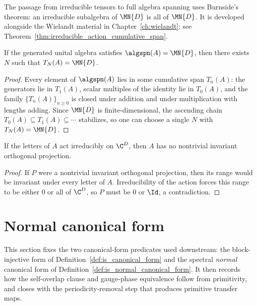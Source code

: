 The passage from irreducible tensors to full algebra spanning uses Burnside's
theorem: an irreducible subalgebra of $\MN{D}$ is all of $\MN{D}$. It is
developed alongside the Wielandt material in Chapter~\ref{ch:wielandt}; see
Theorem~\ref{thm:irreducible_action_cumulative_span}.

\begin{lemma}\label{lem:algspan_cumulative_span}
    \leanok
    If the generated unital algebra satisfies $\algspn(A) = \MN{D}$,
    then there exists $N$ such that $T_N(A) = \MN{D}$.
\end{lemma}

\begin{proof}
    \leanok
    Every element of $\algspn(A)$ lies in some cumulative span $T_n(A)$:
    the generators lie in $T_1(A)$, scalar multiples of the identity lie in
    $T_0(A)$, and the family $\{T_n(A)\}_{n \ge 0}$ is closed under addition
    and under multiplication with lengths adding.
    Since $\MN{D}$ is finite-dimensional, the ascending chain
    $T_0(A) \subseteq T_1(A) \subseteq \cdots$ stabilizes, so one can choose a
    single $N$ with $T_N(A) = \MN{D}$.
\end{proof}

\begin{lemma}\label{lem:irreducible_action_to_tensor}
    \leanok
    If the letters of $A$ act irreducibly on $\C^D$, then $A$ has no nontrivial
    invariant orthogonal projection.
\end{lemma}

\begin{proof}
    \leanok
    If $P$ were a nontrivial invariant orthogonal projection, then its range
    would be invariant under every letter of $A$.
    Irreducibility of the action forces this range to be either $0$ or all of
    $\C^D$, so $P$ must be $0$ or $\Id$, a contradiction.
\end{proof}

\section{Normal canonical form}\label{sec:normal_canonical_form}

This section fixes the two canonical-form predicates used downstream: the
block-injective form of Definition~\ref{def:is_canonical_form} and the spectral
\emph{normal} canonical form of Definition~\ref{def:is_normal_canonical_form}. It
then records how the self-overlap clause and gauge-phase equivalence follow from
primitivity, and closes with the periodicity-removal step that produces primitive
transfer maps.

